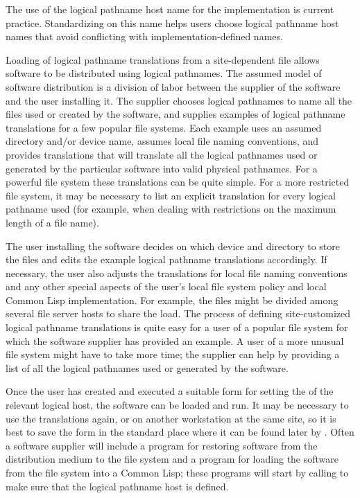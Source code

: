 \begin{newer}

  The use of the logical pathname host name  for the implementation
  is current practice.  Standardizing on this name helps users choose
  logical pathname host names that avoid conflicting with
  implementation-defined names.


  Loading of logical pathname translations from a site-dependent file
  allows software to be distributed using logical pathnames.  The assumed
  model of software distribution is a division of labor between the
  supplier of the software and the user installing it.  The supplier
  chooses logical pathnames to name all the files used or created by the
  software, and supplies examples of logical pathname translations for a
  few popular file systems.  Each example uses an assumed directory and/or
  device name, assumes local file naming conventions, and provides
  translations that will translate all the logical pathnames used or
  generated by the particular software into valid physical pathnames.
  For a powerful file system these translations can be quite simple.  For
  a more restricted file system, it may be necessary to list an explicit
  translation for every logical pathname used (for example, when dealing
  with restrictions on the maximum length of a file name).


  The user installing the software decides on which device and directory
  to store the files and edits the example logical pathname translations
  accordingly.  If necessary, the user also adjusts the translations for
  local file naming conventions and any other special aspects of the user's
  local file system policy and local Common Lisp implementation.  For
  example, the files might be divided among several file server hosts to
  share the load.  The process of defining site-customized logical pathname
  translations is quite easy for a user of a popular file system for which
  the software supplier has provided an example.  A user of a more unusual
  file system might have to take more time; the supplier can help by
  providing a list of all the logical pathnames used or generated by the
  software.\strut

  Once the user has created and executed
  a suitable  form for setting the 
  of the relevant logical host, the software can be loaded and run.  It
  may be necessary to use the translations again, or on another workstation
  at the same site, so it is best to save the  form in the standard
  place where it can be found later by .
  Often a software supplier will include a program for restoring software
  from the distribution medium to the file system and a program for loading
  the software from the file system into a Common Lisp; these programs
  will start by calling  to make sure that
  the logical pathname host is defined.


\end{newer}
